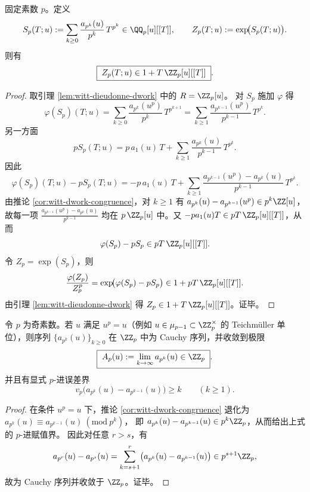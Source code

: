 \begin{theorem}\label{thm:witt-dwork-zp-integrality}
固定素数 \(p\)。定义
\[
S_p(T;u):=\sum_{k\ge 0}\frac{a_{p^k}(u)}{p^k}\,T^{p^k}\in \QQ_p[u][[T]],
\qquad
Z_p(T;u):=\exp\!\bigl(S_p(T;u)\bigr).
\]
则有
\[
\boxed{\;
Z_p(T;u)\in 1+T\,\ZZ_p[u][[T]]\; }.
\]
\end{theorem}
\begin{proof}
取引理 \ref{lem:witt-dieudonne-dwork} 中的 \(R=\ZZ_p[u]\)。
对 \(S_p\) 施加 \(\varphi\) 得
\[
\varphi(S_p)(T;u)
=\sum_{k\ge 0}\frac{a_{p^k}(u^p)}{p^k}\,T^{p^{k+1}}
=\sum_{k\ge 1}\frac{a_{p^{k-1}}(u^p)}{p^{k-1}}\,T^{p^{k}}.
\]
另一方面
\[
pS_p(T;u)
=p\,a_1(u)\,T+\sum_{k\ge 1}\frac{a_{p^k}(u)}{p^{k-1}}\,T^{p^k}.
\]
因此
\[
\varphi(S_p)(T;u)-pS_p(T;u)
=-p\,a_1(u)\,T+\sum_{k\ge 1}\frac{a_{p^{k-1}}(u^p)-a_{p^k}(u)}{p^{k-1}}\,T^{p^k}.
\]
由推论 \ref{cor:witt-dwork-congruence}，对 \(k\ge 1\) 有
\(
a_{p^k}(u)-a_{p^{k-1}}(u^p)\in p^k\ZZ[u]
\)，
故每一项
\(
\frac{a_{p^{k-1}}(u^p)-a_{p^k}(u)}{p^{k-1}}
\)
均在 \(p\,\ZZ_p[u]\) 中。又 \(-p a_1(u)T\in pT\,\ZZ_p[u][[T]]\)，从而
\[
\varphi(S_p)-pS_p\in pT\,\ZZ_p[u][[T]].
\]
令 \(Z_p=\exp(S_p)\)，则
\[
\frac{\varphi(Z_p)}{Z_p^p}
=\exp\!\bigl(\varphi(S_p)-pS_p\bigr)\in 1+pT\,\ZZ_p[u][[T]].
\]
由引理 \ref{lem:witt-dieudonne-dwork} 得 \(Z_p\in 1+T\,\ZZ_p[u][[T]]\)。证毕。
\end{proof}

\begin{proposition}[unit-root 极限不变量：\texorpdfstring{$u^p=u$}{u^p=u} 时 \texorpdfstring{$a_{p^k}(u)$}{a_{p^k}(u)} 在 \texorpdfstring{$\ZZ_p$}{Z_p} 中收敛]\label{prop:witt-unit-root-limit}
令 \(p\) 为奇素数。若 \(u\) 满足 \(u^p=u\)（例如 \(u\in\mu_{p-1}\subset\ZZ_p^\times\) 的 Teichm\"uller 单位），则序列 \(\{a_{p^k}(u)\}_{k\ge 0}\) 在 \(\ZZ_p\) 中为 Cauchy 序列，并收敛到极限
\[
\boxed{\;
A_p(u):=\lim_{k\to\infty}a_{p^k}(u)\in \ZZ_p\; }.
\]
并且有显式 \(p\)-进误差界
\[
v_p\!\bigl(a_{p^k}(u)-a_{p^{k-1}}(u)\bigr)\ge k\qquad(k\ge 1).
\]
\end{proposition}
\begin{proof}
在条件 \(u^p=u\) 下，推论 \ref{cor:witt-dwork-congruence} 退化为
\(
a_{p^k}(u)\equiv a_{p^{k-1}}(u)\ (\mathrm{mod}\ p^k)
\)，
即 \(a_{p^k}(u)-a_{p^{k-1}}(u)\in p^k\ZZ_p\)，从而给出上式的 \(p\)-进赋值界。
因此对任意 \(r>s\)，有
\[
a_{p^r}(u)-a_{p^s}(u)=\sum_{k=s+1}^{r}\bigl(a_{p^k}(u)-a_{p^{k-1}}(u)\bigr)\in p^{s+1}\ZZ_p,
\]
故为 Cauchy 序列并收敛于 \(\ZZ_p\)。证毕。
\end{proof}

